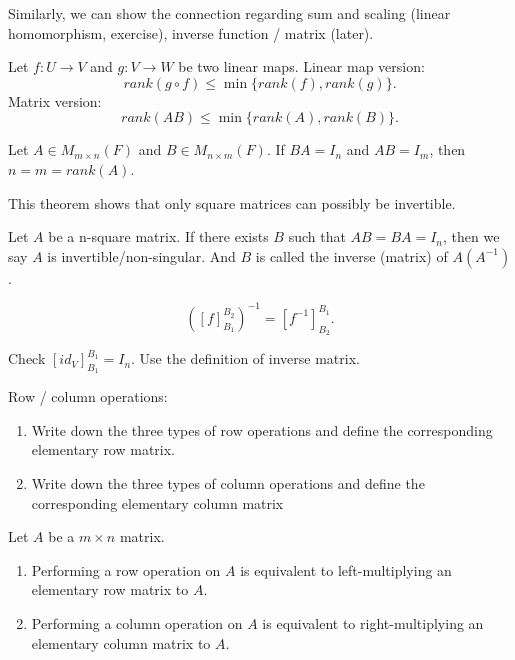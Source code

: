 \documentclass[12pt]{article}
\begin{document}
Similarly, we can show the connection regarding sum and scaling (linear homomorphism, exercise), inverse function / matrix (later).


\begin{theorem}
    Let $f:U\rightarrow V$ and $g:V\rightarrow W$ be two linear maps.
    Linear map version:
    \[rank(g\circ f)\leq \min\{rank(f), rank(g)\}.\]
    Matrix version:
    \[rank(AB)\leq \min\{rank(A), rank(B)\}.\]
\end{theorem}

\begin{theorem}
    Let $A\in M_{m\times n}(F)$ and $B\in M_{n\times m}(F)$.
    If $BA=I_n$ and $AB=I_m$, then $n=m=rank(A)$.
\end{theorem}

This theorem shows that only square matrices can possibly be invertible. 

\begin{definition}
    Let $A$ be a n-square matrix. If there exists $B$ such that $AB=BA=I_n$,
    then we say $A$ is invertible/non-singular. And $B$ is called the inverse (matrix) of $A (A^{-1})$. 
\end{definition}

\begin{theorem}
    \[([f]^{B_2}_{B_1})^{-1} = [f^{-1}]^{B_1}_{B_2}.\]
\end{theorem}
Check $[id_V]^{B_1}_{B_1}=I_n$. Use the definition of inverse matrix.



\begin{exercise}
    Row / column operations:
    \begin{enumerate}
        \item Write down the three types of row operations and define the corresponding elementary row matrix.
        \item Write down the three types of column operations and define the corresponding elementary column matrix
    \end{enumerate}
\end{exercise}

\begin{theorem}
    Let $A$ be a $m\times n$ matrix.
    \begin{enumerate}
        \item Performing a row operation on $A$ is equivalent to left-multiplying an elementary row matrix to $A$.
        \item Performing a column operation on $A$ is equivalent to right-multiplying an elementary column matrix to $A$.
    \end{enumerate}
\end{theorem}
\end{document}
